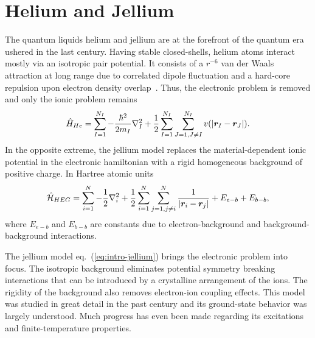 \section{Helium and Jellium}
The quantum liquids helium and jellium are at the forefront of the quantum era ushered in the last century.
Having stable closed-shells, helium atoms interact mostly via an isotropic pair potential. It consists of a $r^{-6}$ van der Waals attraction at long range due to correlated dipole fluctuation and a hard-core repulsion upon electron density overlap~\cite{Aziz1979}.
Thus, the electronic problem is removed and only the ionic problem remains
\begin{align}
\hat{H}_{He} = \sum\limits_{I=1}^{N_I} -\dfrac{\hbar^2}{2m_I}\nabla_I^2
+\frac{1}{2}\sum\limits_{I=1}^{N_I}\sum\limits_{J=1,J\neq I}^{N_I} v(\vert\boldsymbol{r}_I-\boldsymbol{r}_J\vert).
\end{align}
In the opposite extreme, the jellium model replaces the material-dependent ionic potential in the electronic hamiltonian with a rigid homogeneous background of positive charge. In Hartree atomic units
\begin{align} \label{eq:intro-jellium}
\hat{\mathcal{H}}_{HEG} = \sum\limits_{i=1}^N -\dfrac{1}{2}\nabla_i^2 + \frac{1}{2}\sum\limits_{i=1}^N\sum\limits_{j=1,j\neq i}^N
\dfrac{1}{\vert \boldsymbol{r}_i-\boldsymbol{r}_j \vert}
+E_{e-b}+E_{b-b},
\end{align}
where $E_{e-b}$ and $E_{b-b}$ are constants due to electron-background and background-background interactions.

The jellium model eq.~(\ref{eq:intro-jellium}) brings the electronic problem into focus. The isotropic background eliminates potential symmetry breaking interactions that can be introduced by a crystalline arrangement of the ions. The rigidity of the background also removes electron-ion coupling effects. This model was studied in great detail in the past century and its ground-state behavior was largely understood. Much progress has even been made regarding its excitations and finite-temperature properties.

